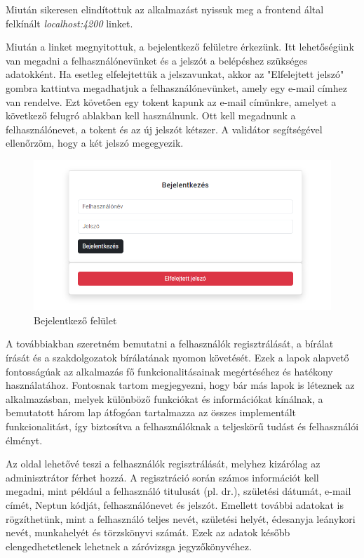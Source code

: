Miután sikeresen elindítottuk az alkalmazást nyissuk meg a frontend által felkínált \textit{localhost:4200} linket.


Miután a linket megnyitottuk, a bejelentkező felületre érkezünk. Itt lehetőségünk van megadni a felhasználónevünket és a jelszót a belépéshez szükséges adatokként. Ha esetleg elfelejtettük a jelszavunkat, akkor az "Elfelejtett jelszó" gombra kattintva megadhatjuk a felhasználónevünket, amely egy e-mail címhez van rendelve. Ezt követően egy tokent kapunk az e-mail címünkre, amelyet a következő felugró ablakban kell használnunk. Ott kell megadnunk a felhasználónevet, a tokent és az új jelszót kétszer. A validátor segítségével ellenőrzöm, hogy a két jelszó megegyezik.

\begin{figure}[h]
\centering
\includegraphics[width=\textwidth]{images/login.png}
\caption{Bejelentkező felület}
\label{fig:login}
\end{figure}

\newpage

A továbbiakban szeretném bemutatni a felhasználók regisztrálását, a bírálat írását és a szakdolgozatok bírálatának nyomon követését. Ezek a lapok alapvető fontosságúak az alkalmazás fő funkcionalitásainak megértéséhez és hatékony használatához. Fontosnak tartom megjegyezni, hogy bár más lapok is léteznek az alkalmazásban, melyek különböző funkciókat és információkat kínálnak, a bemutatott három lap átfogóan tartalmazza az összes implementált funkcionalitást, így biztosítva a felhasználóknak a teljeskörű tudást és felhasználói élményt.





Az oldal lehetővé teszi a felhasználók regisztrálását, melyhez kizárólag az adminisztrátor férhet hozzá. A regisztráció során számos információt kell megadni, mint például a felhasználó titulusát (pl. dr.), születési dátumát, e-mail címét, Neptun kódját, felhasználónevet és jelszót. Emellett további adatokat is rögzíthetünk, mint a felhasználó teljes nevét, születési helyét, édesanyja leánykori nevét, munkahelyét és törzskönyvi számát. Ezek az adatok később elengedhetetlenek lehetnek a záróvizsga jegyzőkönyvéhez.


